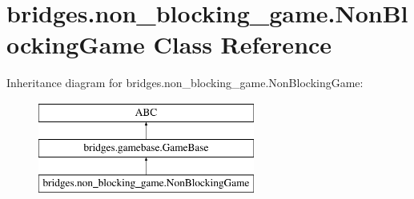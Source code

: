 \hypertarget{classbridges_1_1non__blocking__game_1_1_non_blocking_game}{}\section{bridges.\+non\+\_\+blocking\+\_\+game.\+Non\+Blocking\+Game Class Reference}
\label{classbridges_1_1non__blocking__game_1_1_non_blocking_game}
Inheritance diagram for bridges.\+non\+\_\+blocking\+\_\+game.\+Non\+Blocking\+Game\+:\begin{figure}[H]
\begin{center}
\leavevmode
\includegraphics[height=3.000000cm]{classbridges_1_1non__blocking__game_1_1_non_blocking_game}
\end{center}
\end{figure}

